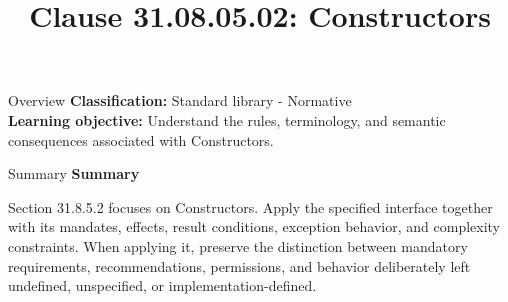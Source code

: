 \documentclass[10pt,letterpaper]{article}
\title{Clause 31.08.05.02: Constructors}
\author{}
\date{}
\begin{document}
\maketitle
\begin{CornellOverviewBox}{Overview}
\textbf{Classification:} Standard library - Normative\\[2pt]
\textbf{Learning objective:} Understand the rules, terminology, and semantic consequences associated with Constructors.
\end{CornellOverviewBox}\begin{CornellSummaryBox}{Summary}
{\sffamily\bfseries\color{Accent} Summary}\par\vspace{3pt}Section 31.8.5.2 focuses on Constructors. Apply the specified interface together with its mandates, effects, result conditions, exception behavior, and complexity constraints. When applying it, preserve the distinction between mandatory requirements, recommendations, permissions, and behavior deliberately left undefined, unspecified, or implementation-defined.
\end{CornellSummaryBox}
\end{document}
